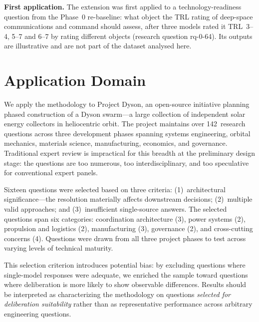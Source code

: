 \documentclass[11pt,a4paper]{article}
\begin{document}
\textbf{First application.} The extension was first applied to a technology-readiness question from the Phase~0 re-baseline: what object the TRL rating of deep-space communications and command should assess, after three models rated it TRL~3--4, 5--7 and 6--7 by rating different objects (research question rq-0-64). Its outputs are illustrative and are not part of the dataset analysed here.

\section{Application Domain}
\label{sec:domain}

We apply the methodology to Project Dyson, an open-source initiative planning phased construction of a Dyson swarm---a large collection of independent solar energy collectors in heliocentric orbit. The project maintains over 142~research questions across three development phases spanning systems engineering, orbital mechanics, materials science, manufacturing, economics, and governance. Traditional expert review is impractical for this breadth at the preliminary design stage: the questions are too numerous, too interdisciplinary, and too speculative for conventional expert panels.

Sixteen questions were selected based on three criteria: (1)~architectural significance---the resolution materially affects downstream decisions; (2)~multiple valid approaches; and (3)~insufficient single-source answers. The selected questions span six categories: coordination architecture (3), power systems (2), propulsion and logistics (2), manufacturing (3), governance (2), and cross-cutting concerns (4). Questions were drawn from all three project phases to test across varying levels of technical maturity.

This selection criterion introduces potential bias: by excluding questions where single-model responses were adequate, we enriched the sample toward questions where deliberation is more likely to show observable differences. Results should be interpreted as characterizing the methodology on questions \emph{selected for deliberation suitability} rather than as representative performance across arbitrary engineering questions.

\end{document}
